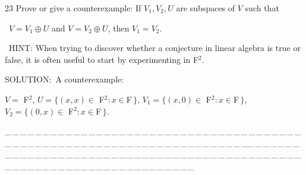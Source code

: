 \documentclass[a4paper, 11pt, UTF8]{article}
\begin{document}
\begin{large}
{\timesbf\Large 23} {\timessl\Large 
Prove or give a counterexample: If $V_1,V_2,U$ are subspaces of $V$ such that}\par\quad\,
{\timessl\Large $V=V_1\oplus U$ and $V=V_2\oplus U$, then $V_1=V_2$.}\par\quad\,
{\timesbf H{\small INT:}} {\timessl\footnotesize
When trying to discover whether a conjecture in linear algebra is true or false, it is often useful to start by experimenting in {\timesbf F}$^2$.
}\par
{\timesbf S\footnotesize{OLUTION:}}\,\,\,A counterexample:\par\quad
$V=$ {\timesbf F}$^2$,  $U=\{(x,x)\in$ {\timesbf F}$^2:x\in${\timesbf F}$\,\}$, $V_1=\{(x,0)\in$ {\timesbf F}$^2:x\in${\timesbf F}$\,\}$, $V_2=\{(0,x)\in$ {\timesbf F}$^2:x\in${\timesbf F}$\,\}$.\par
{\tiny \_\,\_\,\_\,\_\,\_\,\_\,\_\,\_\,\_\,\_\,\_\,\_\,\_\,\_\,\_\,\_\,\_\,\_\,\_\,\_\,\_\,\_\,\_\,\_\,\_\,\_\,\_\,\_\,\_\,\_\,\_\,\_\,\_\,\_\,\_\,\_\,\_\,\_\,\_\,\_\,\_\,\_\,\_\,\_\,\_\,\_\,\_\,\_\,\_\,\_\,\_\,\_\,\_\,\_\,\_\,\_\,\_\,\_\,\_\,\_\,\_\,\_\,\_\,\_\,\_\,\_\,\_\,\_\,\_\,\_\,\_\_\,\_\,\_\,\_\,\_\,\_\,\_\,\_\,\_\,\_\,\_\,\_\,\_\,\_\,\_\,\_\,\_\,\_\,\_\,\_\,\_\,\_\,\_\,\_\,\_\,\_\,\_\,\_\,\_\,\_\,\_\,\_\,\_\,\_\,\_\,\_\,\_\,\_\,\_\,\_\,\_\,\_\,\_\,\_\,\_\,\_\,\_\,\_\,\_\,\_\,\_\,\_\,\_\,\_\,\_\,\_\,\_\,\_\,\_\,\_\,\_\,\_\,\_\,\_\,\_\,\_\,\_\,\_\,\_\,\_\,\_}\par


\end{large}
\end{document}
